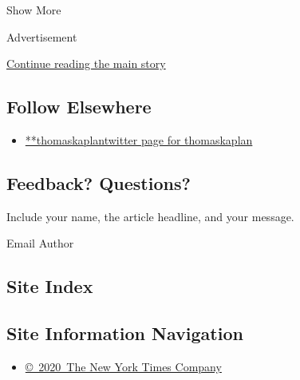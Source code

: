 Show More

Advertisement

\protect\hyperlink{after-mid2}{Continue reading the main story}

\hypertarget{follow-elsewhere}{%
\subsection{Follow Elsewhere}\label{follow-elsewhere}}

\begin{itemize}
\tightlist
\item
  \href{https://twitter.com/thomaskaplan}{**thomaskaplantwitter page for
  thomaskaplan}
\end{itemize}

\hypertarget{feedback-questions}{%
\subsection{Feedback? Questions?}\label{feedback-questions}}

Include your name, the article headline, and your message.

Email Author

\hypertarget{site-index}{%
\subsection{Site Index}\label{site-index}}

\hypertarget{site-information-navigation}{%
\subsection{Site Information
Navigation}\label{site-information-navigation}}

\begin{itemize}
\tightlist
\item
  \href{https://help.nytimes.com/hc/en-us/articles/115014792127-Copyright-notice}{©~2020~The
  New York Times Company}
\end{itemize}

